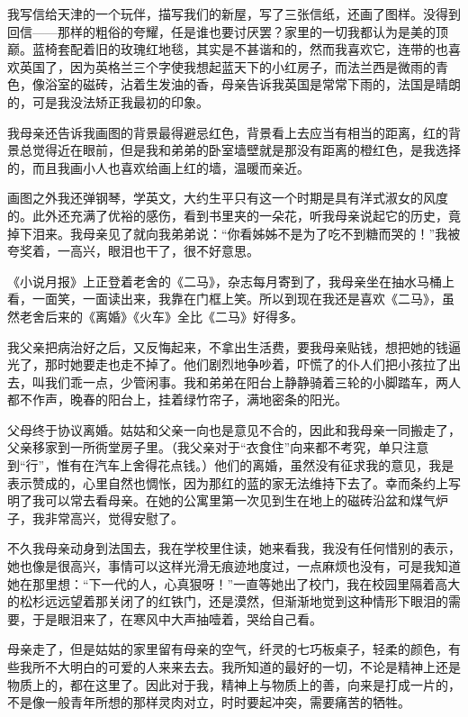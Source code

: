 \par 我写信给天津的一个玩伴，描写我们的新屋，写了三张信纸，还画了图样。没得到回信——那样的粗俗的夸耀，任是谁也要讨厌罢？家里的一切我都认为是美的顶巅。蓝椅套配着旧的玫瑰红地毯，其实是不甚谐和的，然而我喜欢它，连带的也喜欢英国了，因为英格兰三个字使我想起蓝天下的小红房子，而法兰西是微雨的青色，像浴室的磁砖，沾着生发油的香，母亲告诉我英国是常常下雨的，法国是晴朗的，可是我没法矫正我最初的印象。
\par 我母亲还告诉我画图的背景最得避忌红色，背景看上去应当有相当的距离，红的背景总觉得近在眼前，但是我和弟弟的卧室墙壁就是那没有距离的橙红色，是我选择的，而且我画小人也喜欢给画上红的墙，温暖而亲近。
\par 画图之外我还弹钢琴，学英文，大约生平只有这一个时期是具有洋式淑女的风度的。此外还充满了优裕的感伤，看到书里夹的一朵花，听我母亲说起它的历史，竟掉下泪来。我母亲见了就向我弟弟说：“你看姊姊不是为了吃不到糖而哭的！”我被夸奖着，一高兴，眼泪也干了，很不好意思。
\par 《小说月报》上正登着老舍的《二马》，杂志每月寄到了，我母亲坐在抽水马桶上看，一面笑，一面读出来，我靠在门框上笑。所以到现在我还是喜欢《二马》，虽然老舍后来的《离婚》《火车》全比《二马》好得多。
\par 我父亲把病治好之后，又反悔起来，不拿出生活费，要我母亲贴钱，想把她的钱逼光了，那时她要走也走不掉了。他们剧烈地争吵着，吓慌了的仆人们把小孩拉了出去，叫我们乖一点，少管闲事。我和弟弟在阳台上静静骑着三轮的小脚踏车，两人都不作声，晚春的阳台上，挂着绿竹帘子，满地密条的阳光。
\par 父母终于协议离婚。姑姑和父亲一向也是意见不合的，因此和我母亲一同搬走了，父亲移家到一所衖堂房子里。（我父亲对于“衣食住”向来都不考究，单只注意到“行”，惟有在汽车上舍得花点钱。）他们的离婚，虽然没有征求我的意见，我是表示赞成的，心里自然也惆怅，因为那红的蓝的家无法维持下去了。幸而条约上写明了我可以常去看母亲。在她的公寓里第一次见到生在地上的磁砖沿盆和煤气炉子，我非常高兴，觉得安慰了。
\par 不久我母亲动身到法国去，我在学校里住读，她来看我，我没有任何惜别的表示，她也像是很高兴，事情可以这样光滑无痕迹地度过，一点麻烦也没有，可是我知道她在那里想：“下一代的人，心真狠呀！”一直等她出了校门，我在校园里隔着高大的松杉远远望着那关闭了的红铁门，还是漠然，但渐渐地觉到这种情形下眼泪的需要，于是眼泪来了，在寒风中大声抽噎着，哭给自己看。
\par 母亲走了，但是姑姑的家里留有母亲的空气，纤灵的七巧板桌子，轻柔的颜色，有些我所不大明白的可爱的人来来去去。我所知道的最好的一切，不论是精神上还是物质上的，都在这里了。因此对于我，精神上与物质上的善，向来是打成一片的，不是像一般青年所想的那样灵肉对立，时时要起冲突，需要痛苦的牺牲。
